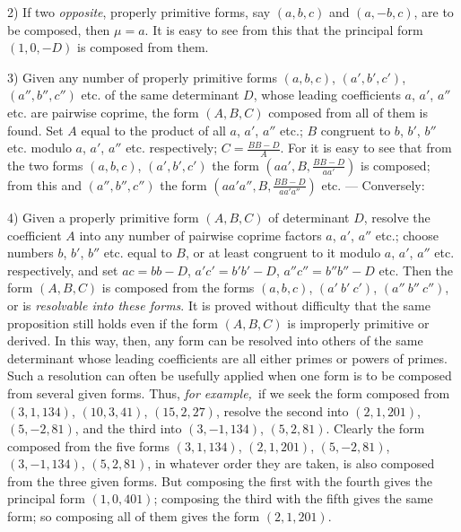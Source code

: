 2) If two \textit{opposite}, properly primitive forms, say $(a,b,c)$ and $(a,-b,c)$, are to be composed, then $\mu=a$. It is easy to see from this that the principal form $(1,0,-D)$ is composed from them.

3) Given any number of properly primitive forms $(a,b,c)$, $(a',b',c')$, $(a'',b'',c'')$ etc. of the same determinant $D$, whose leading coefficients $a$, $a'$, $a''$ etc. are pairwise coprime, the form $(A,B,C)$ composed from all of them is found. Set $A$ equal to the product of all $a$, $a'$, $a''$ etc.; $B$ congruent to $b$, $b'$, $b''$ etc. modulo $a$, $a'$, $a''$ etc. respectively; $C=\frac{BB-D}{A}$. For it is easy to see that from the two forms $(a,b,c)$, $(a',b',c')$ the form $(aa',B,\frac{BB-D}{aa'})$ is composed; from this and $(a'',b'',c'')$ the form $(aa'a'',B,\frac{BB-D}{aa'a''})$ etc. --- Conversely:

4) Given a properly primitive form $(A,B,C)$ of determinant $D$, resolve the coefficient $A$ into any number of pairwise coprime factors $a$, $a'$, $a''$ etc.; choose numbers $b$, $b'$, $b''$ etc. equal to $B$, or at least congruent to it modulo $a$, $a'$, $a''$ etc. respectively, and set $ac=bb-D$, $a'c'=b'b'-D$, $a''c''=b''b''-D$ etc. Then the form $(A,B,C)$ is composed from the forms $(a,b,c)$, $(a'\ b'\ c')$, $(a''\ b''\ c'')$, or is \textit{resolvable into these forms}. It is proved without difficulty that the same proposition still holds even if the form $(A,B,C)$ is improperly primitive or derived. In this way, then, any form can be resolved into others of the same determinant whose leading coefficients are all either primes or powers of primes. Such a resolution can often be usefully applied when one form is to be composed from several given forms. Thus, \textit{for example,}\ if we seek the form composed from $(3,1,134)$, $(10,3,41)$, $(15,2,27)$, resolve the second into $(2,1,201)$, $(5,-2,81)$, and the third into $(3,-1,134)$, $(5,2,81)$. Clearly the form composed from the five forms $(3,1,134)$, $(2,1,201)$, $(5,-2,81)$, $(3,-1,134)$, $(5,2,81)$, in whatever order they are taken, is also composed from the three given forms. But composing the first with the fourth gives the principal form $(1,0,401)$; composing the third with the fifth gives the same form; so composing all of them gives the form $(2,1,201)$.

